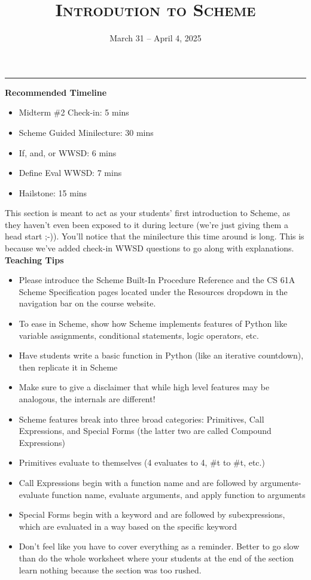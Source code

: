 \documentclass{exam}
\title{\textsc{Introdution to Scheme}}
\date{March 31 -- April 4, 2025}
\begin{document}
\maketitle
\rule{\textwidth}{0.15em}

\begin{meta}
\begin{blocksection}
    \textbf{Recommended Timeline}
    \begin{itemize}
        \item Midterm \#2 Check-in: 5 mins
        \item Scheme Guided Minilecture: 30 mins
        \item If, and, or WWSD: 6 mins
        \item Define Eval WWSD: 7 mins
        \item Hailstone: 15 mins
    \end{itemize}
\end{blocksection}
\end{meta}
\begin{meta}
    This section is meant to act as your students' first introduction to Scheme, as they haven't even been exposed to it during lecture (we're just giving them a head start ;-)). You'll notice that the minilecture this time around is long. This is because we've added check-in WWSD questions to go along with explanations.
\textbf{Teaching Tips}
\begin{itemize}
    \item Please introduce the Scheme Built-In Procedure Reference and the CS 61A Scheme Specification pages located under the Resources dropdown in the navigation bar on the course website.
    \item To ease in Scheme, show how Scheme implements features of Python like variable assignments, conditional statements, logic operators, etc.
    \item Have students write a basic function in Python (like an iterative countdown), then replicate it in Scheme
    \item Make sure to give a disclaimer that while high level features may be analogous, the internals are different!
    \item Scheme features break into three broad categories: Primitives, Call Expressions, and Special Forms (the latter two are called Compound Expressions)
    \item Primitives evaluate to themselves (4 evaluates to 4, \#t to \#t, etc.)
    \item Call Expressions begin with a function name and are followed by arguments- evaluate function name, evaluate arguments, and apply function to arguments
    \item Special Forms begin with a keyword and are followed by subexpressions, which are evaluated in a way based on the specific keyword
    \item Don't feel like you have to cover everything as a reminder. Better to go slow than do the whole worksheet where your students at the end of the section learn nothing because the section was too rushed.
\end{itemize}
\end{meta}
\end{document}
